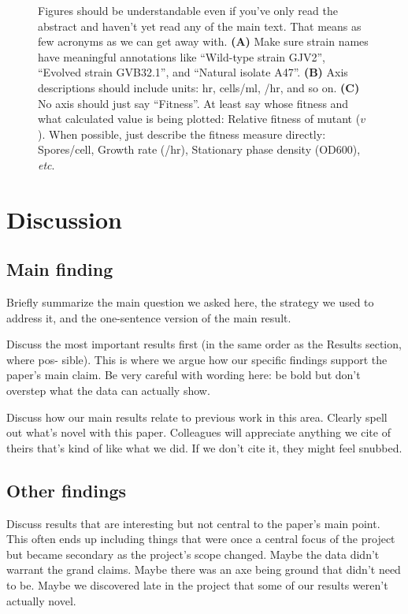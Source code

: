 \documentclass[11pt]{article}
\begin{document}
\begin{figure}[p]
\caption{
Figures should be understandable even if you've only read the abstract and haven't yet read any of the main text. That means as few acronyms as we can get away with. 
\textbf{(A)} Make sure strain names have meaningful annotations like ``Wild-type strain GJV2'', ``Evolved strain GVB32.1'', and ``Natural isolate A47''. 
\textbf{(B)} Axis descriptions should include units: hr, cells/ml, /hr, and so on. 
\textbf{(C)} No axis should just say ``Fitness''. At least say whose fitness and what calculated value is being plotted: Relative fitness of mutant ($v$). When possible, just describe the fitness measure directly: Spores/cell, Growth rate (/hr), Stationary phase density (OD600), \textit{etc}. 
}
\label{fig:second-message}
\end{figure}




\clearpage
\section{Discussion}

\subsection{Main finding}

Briefly summarize the main question we asked here, the strategy we used to address it, and the one-sentence version of the main result.

Discuss the most important results first (in the same order as the Results section, where pos- sible). This is where we argue how our specific findings support the paper's main claim. Be very careful with wording here: be bold but don't overstep what the data can actually show.

Discuss how our main results relate to previous work in this area. Clearly spell out what's novel with this paper. Colleagues will appreciate anything we cite of theirs that's kind of like what we did. If we don't cite it, they might feel snubbed.

\subsection{Other findings}

Discuss results that are interesting but not central to the paper's main point. This often ends up including things that were once a central focus of the project but became secondary as the project's scope changed. Maybe the data didn't warrant the grand claims. Maybe there was an axe being ground that didn't need to be. Maybe we discovered late in the project that some of our results weren't actually novel.
\end{document}

